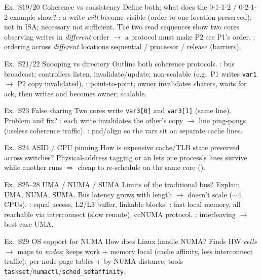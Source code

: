 \begin{example2}{Ex.\ S19/20 Coherence vs consistency}
    Define both; what does the 0-1-1-2 / 0-2-1-2 example show?
    \tcblower
    : a write \emph{will} become visible (order to one location preserved); not in ISA; necessary not sufficient. The two read sequences show two cores observing writes in \emph{different} order $\to$ a protocol must make P2 see P1's order. : ordering across \emph{different} locations sequential / processor / release (barriers).
\end{example2}

\begin{example2}{Ex.\ S21/22 Snooping vs directory}
    Outline both coherence protocols.
    \tcblower
    : bus broadcast; controllers listen, invalidate/update; non-scalable (e.g.\ P1 writes \texttt{var1} $\to$ P2 copy invalidated). : point-to-point; owner invalidates sharers, waits for ack, then writes and becomes owner; scalable.
\end{example2}

\begin{example2}{Ex.\ S23 False sharing}
    Two cores write \texttt{var3[0]} and \texttt{var3[1]} (same line). Problem and fix?
    \tcblower
    : each write invalidates the other's copy $\to$ line ping-pongs (useless coherence traffic). : pad/align so the vars sit on separate cache lines.
\end{example2}

\begin{example2}{Ex.\ S24 ASID / CPU pinning}
    How is expensive cache/TLB state preserved across switches?
    \tcblower
    Physical-address tagging or an  lets one process's lines survive while another runs $\Rightarrow$ cheap to re-schedule on the same core ().
\end{example2}

\begin{example2}{Ex.\ S25--28 UMA / NUMA / SUMA}
    Limits of the traditional bus? Explain UMA, NUMA, SUMA.
    \tcblower
    Bus latency grows with length $\to$ doesn't scale ($\sim$4 CPUs). : equal access, L2/L3 buffer, linkable blocks. : fast local memory, all reachable via interconnect (slow remote), ccNUMA protocol. : interleaving $\to$ best-case UMA.
\end{example2}

\begin{example2}{Ex.\ S29 OS support for NUMA}
    How does Linux handle NUMA?
    \tcblower
    Finds HW \emph{cells} $\to$ maps to \emph{nodes}; keeps work + memory local (cache affinity, less interconnect traffic); per-node page tables +  by NUMA distance; tools \texttt{taskset}/\texttt{numactl}/\texttt{sched\_setaffinity}.
\end{example2}
